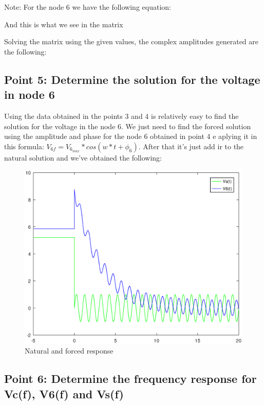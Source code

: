 Note: For the node 6 we have the following equation:


And this is what we see in the matrix

Solving the matrix using the given values, the complex amplitudes generated are the following:



\subsection{Point 5: Determine the solution for the voltage in node 6}

Using the data obtained in the points 3 and 4 is relatively easy to find the solution for the voltage in the node 6. We just need to find the forced solution using the amplitude and phase for the node 6 obtained in point 4 e aplying it in this formula: $V_{6f} = V_{6_{max}}*cos(w*t + \phi_{6})$. After that it's just add ir to the natural solution and we've obtained the following:

\begin{figure}[H]
\centering
\includegraphics[width = 15cm]{Solution.eps}
\caption {Natural and forced response}
\end{figure}


\subsection{Point 6: Determine the frequency response for Vc(f), V6(f) and Vs(f)}

